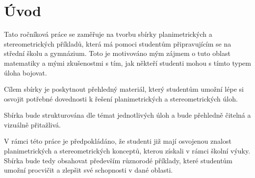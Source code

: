 \chapter*{Úvod}

Tato ročníková práce se zaměřuje na tvorbu sbírky planimetrických a stereometrických příkladů, která má pomoci studentům připravujícím se na střední školu a gymnázium. Toto je motivováno mým zájmem o tuto oblast matematiky a mými zkušenostmi s tím, jak někteří studenti mohou s tímto typem úloha bojovat.

Cílem sbírky je poskytnout přehledný materiál, který studentům umožní lépe si osvojit potřebné dovednosti k řešení planimetrických a stereometrických úloh.

Sbírka bude strukturována dle témat jednotlivých úloh a bude přehledně čitelná a vizuálně přitažlivá.

V rámci této práce je předpokládáno, že studenti již mají osvojenou znalost planimetrických a stereometrických konceptů, kterou získali v rámci školní výuky. Sbírka bude tedy obsahovat především různorodé příklady, které studentům umožní procvičit a zlepšit své schopnosti v dané oblasti.
